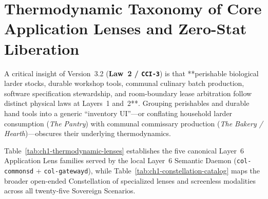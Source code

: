 \section{Thermodynamic Taxonomy of Core Application Lenses and Zero-Stat Liberation}
\label{sec:ch1-constellation}

A critical insight of Version~3.2 (\textbf{Law~2 / \texttt{CCI-3}}) is that **perishable biological
larder stocks, durable workshop tools, communal culinary batch production, software specification
stewardship, and room-boundary lease arbitration follow distinct physical laws at Layers~1 and~2**.
Grouping perishables and durable hand tools into a generic ``inventory UI''---or conflating
household larder consumption (\textit{The Pantry}) with communal commissary production
(\textit{The Bakery / Hearth})---obscures their underlying thermodynamics.

Table~\ref{tab:ch1-thermodynamic-lenses} establishes the five canonical Layer~6 Application Lens
families served by the local Layer~6 Semantic Daemon (\texttt{col-commonsd} +
\texttt{col-gatewayd}), while Table~\ref{tab:ch1-constellation-catalog} maps the broader
open-ended Constellation of specialized lenses and screenless modalities across all twenty-five
Sovereign Scenarios.

